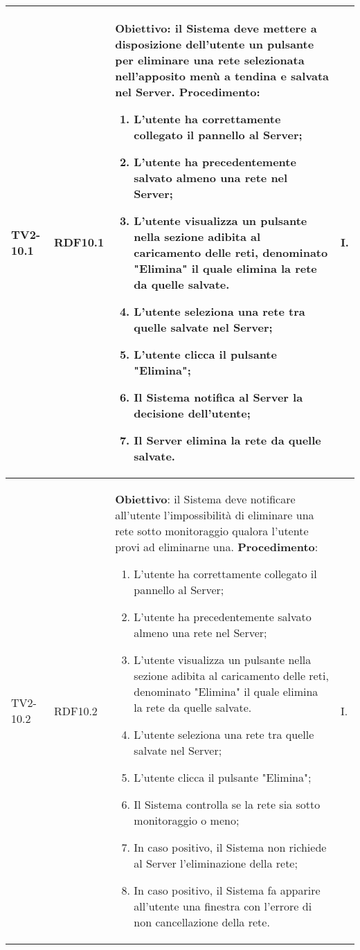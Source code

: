 \begin{longtable}{|C{.15\textwidth}|C{.13\textwidth}|m{.52\textwidth}|C{.08\textwidth}|}
TV2-10.1 & RDF10.1 &
	\textbf{Obiettivo}: il Sistema deve mettere a disposizione dell'utente un pulsante per eliminare una rete selezionata nell'apposito menù a tendina e salvata nel Server. \newline
	\textbf{Procedimento}:
	\begin{enumerate}
		\item L'utente ha correttamente collegato il pannello al Server;
		\item L'utente ha precedentemente salvato almeno una rete nel Server;
		\item L'utente visualizza un pulsante nella sezione adibita al caricamento delle reti, denominato "Elimina" il quale elimina la rete da quelle salvate.
		\item L'utente seleziona una rete tra quelle salvate nel Server;
		\item L'utente clicca il pulsante "Elimina";
		\item Il Sistema notifica al Server la decisione dell'utente;
		\item Il Server elimina la rete da quelle salvate.
	\end{enumerate}
	& I. \\
\hline

TV2-10.2 & RDF10.2 &
	\textbf{Obiettivo}: il Sistema deve notificare all'utente l'impossibilità di eliminare una rete sotto monitoraggio qualora l'utente provi ad eliminarne una. \newline
	\textbf{Procedimento}:
	\begin{enumerate}
		\item L'utente ha correttamente collegato il pannello al Server;
		\item L'utente ha precedentemente salvato almeno una rete nel Server;
		\item L'utente visualizza un pulsante nella sezione adibita al caricamento delle reti, denominato "Elimina" il quale elimina la rete da quelle salvate.
		\item L'utente seleziona una rete tra quelle salvate nel Server;
		\item L'utente clicca il pulsante "Elimina";
		\item Il Sistema controlla se la rete sia sotto monitoraggio o meno;
		\item In caso positivo, il Sistema non richiede al Server l'eliminazione della rete;
		\item In caso positivo, il Sistema fa apparire all'utente una finestra con l'errore di non cancellazione della rete.
	\end{enumerate}
	& I. \\
\hline


\end{longtable}
